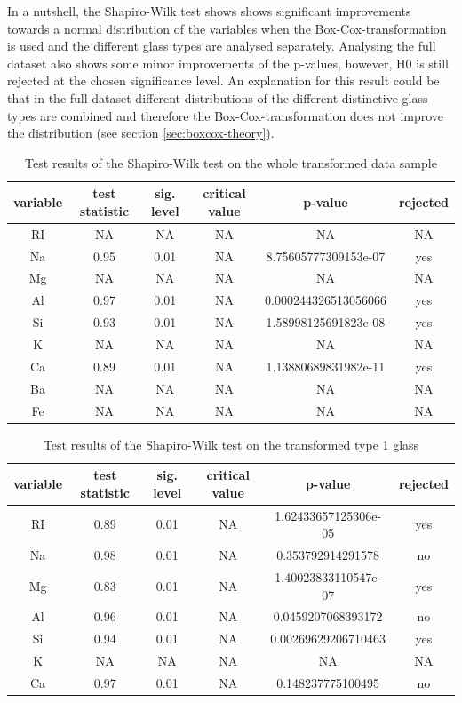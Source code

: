\documentclass[a4paper, 12pt, titlepage, headsepline, listof = totoc, bibliography = totoc, numbers = noenddot]{scrartcl}
\begin{document}
In a nutshell, the Shapiro-Wilk test shows shows significant improvements towards a normal distribution of the variables when the Box-Cox-transformation is used and the different glass types are analysed separately. Analysing the full dataset also shows some minor improvements of the p-values, however, H0 is still rejected at the chosen significance level. An explanation for this result could be that in the full dataset different distributions of the different distinctive glass types are combined and therefore the Box-Cox-transformation does not improve the distribution (see section \ref{sec:boxcox-theory}).




\begin{table}[h!]
\centering
\begin{tabular}{|cccccc|} \hline variable & test statistic & sig. level & critical value & p-value & rejected\\ \hline RI & NA & NA & NA & NA & NA\\ 
Na & 0.95 & 0.01 & NA & 8.75605777309153e-07 & yes\\ 
Mg & NA & NA & NA & NA & NA\\ 
Al & 0.97 & 0.01 & NA & 0.000244326513056066 & yes\\ 
Si & 0.93 & 0.01 & NA & 1.58998125691823e-08 & yes\\ 
K & NA & NA & NA & NA & NA\\ 
Ca & 0.89 & 0.01 & NA & 1.13880689831982e-11 & yes\\ 
Ba & NA & NA & NA & NA & NA\\ 
Fe & NA & NA & NA & NA & NA\\ \hline \end{tabular}\caption{Test results of the Shapiro-Wilk test on the whole transformed data sample}
\label{tab:testresFullSWtrans}
\end{table}

\begin{table}[h!]
\centering
\begin{tabular}{|cccccc|} \hline variable & test statistic & sig. level & critical value & p-value & rejected\\ \hline RI & 0.89 & 0.01 & NA & 1.62433657125306e-05 & yes\\ 
Na & 0.98 & 0.01 & NA & 0.353792914291578 & no\\ 
Mg & 0.83 & 0.01 & NA & 1.40023833110547e-07 & yes\\ 
Al & 0.96 & 0.01 & NA & 0.0459207068393172 & no\\ 
Si & 0.94 & 0.01 & NA & 0.00269629206710463 & yes\\ 
K & NA & NA & NA & NA & NA\\ 
Ca & 0.97 & 0.01 & NA & 0.148237775100495 & no\\ \hline \end{tabular}\caption{Test results of the Shapiro-Wilk test on the transformed type 1 glass}
\label{tab:testrestype1SWtrans}
\end{table}
\end{document}
